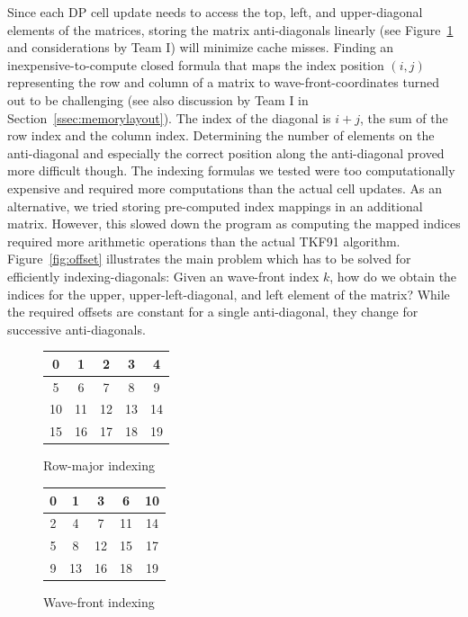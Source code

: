 \documentclass[runningheads,a4paper]{llncs}
\begin{document}
Since each DP cell update needs to access the top, left, and upper-diagonal elements of the matrices,
storing the matrix anti-diagonals linearly (see Figure~\ref{fig:wavefront} and considerations by Team I)
will minimize cache misses.
Finding an inexpensive-to-compute closed formula that maps the index position $(i,j)$ representing the row and column of a matrix
to wave-front-coordinates turned out to be challenging (see also discussion by Team I in Section~\ref{ssec:memorylayout}).
The index of the diagonal is $i+j$, the sum of the row index and the column index.
Determining the number of elements on the anti-diagonal and especially the correct position along the anti-diagonal proved more difficult though.
The indexing formulas we tested were too computationally expensive and required more computations than the actual cell updates.
As an alternative, we tried storing pre-computed index mappings in an additional matrix.
However, this slowed down the program as computing the mapped indices required more arithmetic operations than the actual TKF91 algorithm.
Figure~\ref{fig:offset} illustrates the main problem which has to be solved
for efficiently indexing-diagonals: Given an wave-front index $k$, how do we obtain the indices for the upper, upper-left-diagonal, and left element of the matrix?
While the required offsets are constant for a single anti-diagonal, they change for successive anti-diagonals.

\begin{figure}

\begin{minipage}{0.5\textwidth}
\centering
\begin{tabular}{|c|c|c|c|c|}
\hline
0 & 1 & 2 & 3 & 4 \\
\hline
5 & 6 & 7 & 8 & 9 \\
\hline
10 & 11 & 12 & 13 & 14 \\
\hline
15 & 16 & 17 & 18 & 19 \\
\hline
\end{tabular}
\caption{Row-major indexing}
\label{fig:rowmajor}
\end{minipage}
\begin{minipage}{0.5\textwidth}
\centering
\begin{tabular}{|c|c|c|c|c|}
\hline
0 & 1 & 3 & 6 & 10 \\
\hline
2 & 4 & 7 & 11 & 14 \\
\hline
5 & 8 & 12 & 15 & 17 \\
\hline
9 & 13 & 16 & 18 & 19 \\
\hline
\end{tabular}
\caption{Wave-front indexing}
\label{fig:wavefront}
\end{minipage}
\end{figure}
\end{document}
